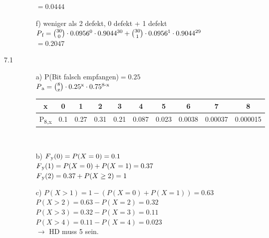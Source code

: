 \documentclass[a4paper]{article}
\begin{document}
\begin{description}
\begin{itemize}
								$=0.0444$\\
								
			\item[f)] weniger als 2 defekt, 0 defekt + 1 defekt\\
							
								$P\textsubscript{f}= {{30}\choose{0}} \cdot 0.0956\textsuperscript{0} \cdot 0.9044\textsuperscript{30} + {{30}\choose{1}} \cdot 0.0956\textsuperscript{1} \cdot 0.9044\textsuperscript{29}$\\
								$= 0.2047$\\
		\end{itemize}
		
\item[7.1]
		\begin{itemize}
			\item[a)] P(Bit falsch empfangen)$= 0.25$\\
								
								$P\textsubscript{a}= {{8}\choose{x}}\cdot 0.25\textsuperscript{x}\cdot 0.75\textsuperscript{8-x}$\\
								
								\begin{tabular}{c|c|c|c|c|c|c|c|c|c}
									x & 0 & 1 & 2 & 3 & 4 & 5 & 6 & 7 & 8	\\
									\midrule
									P\textsubscript{8,x} & 0.1 & 0.27 & 0.31 & 0.21 & 0.087 & 0.023 & 0.0038 & 0.00037 & 0.000015\\
								\end{tabular}\\
								
			\item[b)] $F\textsubscript{y}(0)= P(X=0)= 0.1$\\
			
								$F\textsubscript{y}(1)= P(X=0) + P(X=1)= 0.37 $\\
								
								$F\textsubscript{y}(2)= 0.37 + P(X\geq 2)= 1$\\
			
			\item[c)] $P(X>1)= 1-(P(X=0)+P(X=1))= 0.63$\\
								$P(X>2)= 0.63-P(X=2)= 0.32$\\
								$P(X>3)= 0.32-P(X=3)= 0.11$\\
								$P(X>4)= 0.11-P(X=4)= 0.023$\\
								$\rightarrow$ HD muss 5 sein.
		\end{itemize}
		

\end{description}
\end{document}

